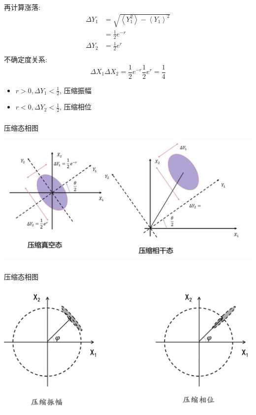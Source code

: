 \begin{frame}
  再计算涨落:  \\
  \[\begin{aligned}
    \Delta Y_1 &= \sqrt{ \left\langle Y_1 ^2 \right\rangle - \left\langle Y_1 \right\rangle ^2 } \\ 
    &=\frac{1}{2} e^{-r}  \\ 
 \Delta Y_2 &= \frac{1}{2} e^{r}  \\ 
\end{aligned} \]  
 不确定度关系: 
 \[  \Delta X_1 \Delta X_2 = \frac{1}{2} e^{-r} \frac{1}{2} e^{r} = \dfrac{1}{4} \]

 \begin{itemize}
     \item $ r>0, \Delta Y_1 < \frac{1}{2} $, 压缩振幅 
     \item $ r<0, \Delta Y_2 < \frac{1}{2} $, 压缩相位
 \end{itemize}


\end{frame}

\begin{frame}
 \frametitle{}
 压缩态相图
   \begin{center}
        \includegraphics[width=1.0\textwidth]{figs/2022-05-02-13-13-46.png}
   \end{center}   
\end{frame}

\begin{frame}
    \frametitle{}
    压缩态相图
      \begin{center}
           \includegraphics[width=1.0\textwidth]{figs/9.png}
      \end{center}   
   \end{frame}

